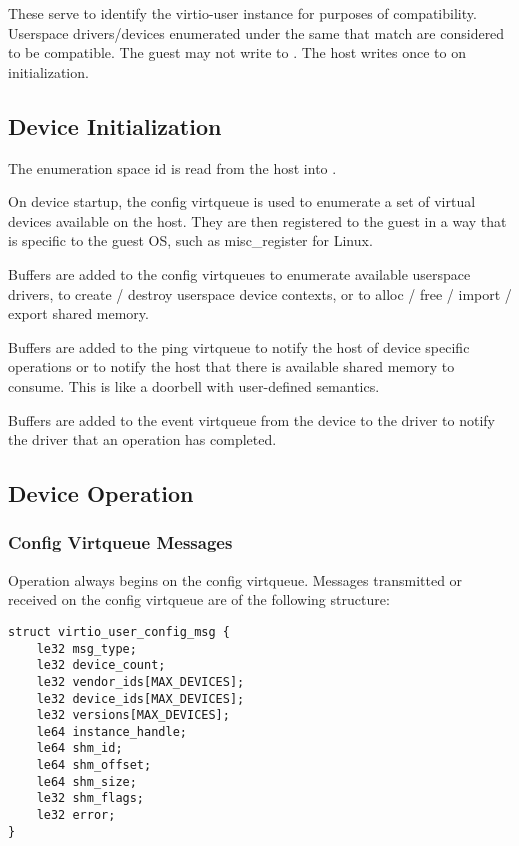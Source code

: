 These serve to identify the virtio-user instance for purposes of compatibility.
Userspace drivers/devices enumerated under the same  that match are considered to be compatible.
The guest may not write to .
The host writes once to  on initialization.

\subsection{Device Initialization}\label{sec:Device Types / User Device / Device Initialization}

The enumeration space id is read from the host into .

On device startup, the config virtqueue is used to enumerate a set of virtual devices available on the host.
They are then registered to the guest in a way that is specific to the guest OS,
such as misc_register for Linux.

Buffers are added to the config virtqueues
to enumerate available userspace drivers,
to create / destroy userspace device contexts,
or to alloc / free / import / export shared memory.

Buffers are added to the ping virtqueue to notify the host of device specific operations
or to notify the host that there is available shared memory to consume.
This is like a doorbell with user-defined semantics.

Buffers are added to the event virtqueue from the device to the driver to
notify the driver that an operation has completed.

\subsection{Device Operation}\label{sec:Device Types / User Device / Device Operation}

\subsubsection{Config Virtqueue Messages}\label{sec:Device Types / User Device / Device Operation / Config Virtqueue Messages}

Operation always begins on the config virtqueue.
Messages transmitted or received on the config virtqueue are of the following structure:

\begin{lstlisting}
struct virtio_user_config_msg {
    le32 msg_type;
    le32 device_count;
    le32 vendor_ids[MAX_DEVICES];
    le32 device_ids[MAX_DEVICES];
    le32 versions[MAX_DEVICES];
    le64 instance_handle;
    le64 shm_id;
    le64 shm_offset;
    le64 shm_size;
    le32 shm_flags;
    le32 error;
}
\end{lstlisting}

